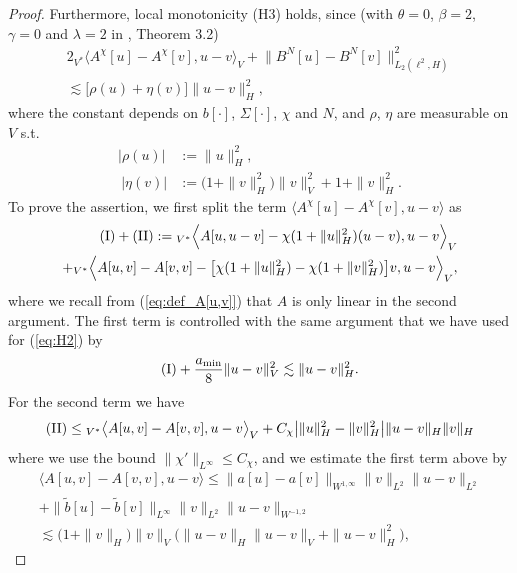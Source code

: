 \begin{proof}
Furthermore, local monotonicity (H3) holds, since (with $\theta = 0$, $\beta = 2$, $\gamma = 0$ and $\lambda = 2$ in \cite{RSZ22}, Theorem 3.2)
    \begin{equation}\label{eq:H3}
    \begin{split}
2{}_{V^*}\big\langle A^{\chi}[u] - A^{\chi}[v], u-v\big\rangle_V + \big\|B^N[u] - B^N[v]\big\|_{L_2(\ell^2,H)}^2 \\ \lesssim \big[\rho(u) + \eta(v)\big] \|u-v\|_H^2,
\end{split}
    \end{equation}
where the constant depends on $b[\cdot]$, $\Sigma[\cdot]$, $\chi$ and $N$, and $\rho$, $\eta$ are measurable on $V$ s.t.
\begin{align*}
    |\rho(u)|  & := \|u\|_{H}^2,\\
    \ |\eta(v)| & :=\big(1 + \|v\|^2_{H}\big)\|v\|^2_V + 1 + \|v\|^2_{H}.
\end{align*}
To prove the assertion, we first split the term $\big\langle A^{\chi}[u] - A^{\chi}[v] , u -v  \big\rangle$ as
\begin{align*}
 (\rom{1}) + (\rom{2})  : =  {}_{V^*}\Big\langle A[u,u - v] - \chi(1 + \|u\|_{H}^2) (u-v), u -v  \Big\rangle_V\\
     +  {}_{V^*}\Big\langle A[u,v] - A[v,v] - \big[\chi(1 + \|u\|_{H}^2) - \chi(1 + \|v\|_{H}^2)\big]v, u -v  \Big\rangle_V,
    \end{align*}
where we recall from (\ref{eq:def_A[u,v]}) that $A$ is only linear in the second argument. The first term is controlled with the same argument that we have used for (\ref{eq:H2}) by 
\begin{equation}\label{eq:loc_mon_I}
     (\rom{1}) + \frac{a_{\min}}{8} \|u - v\|_{V}^2  \lesssim \|u-v\|_H^2.
\end{equation}
For the second term we have 
\begin{align*}
     (\rom{2}) 
 \leq {}_{V^*}\big\langle A[u,v] - A[v,v], u-v\big\rangle_V + C_{\chi}\big|\|u\|^2_{H}- \|v\|_{H}^2\big|\|u - v\|_H\|v\|_H 
\end{align*}
where we use the bound $\|\chi'\|_{L^{\infty}} \leq C_{\chi}$, and we estimate the first term above by
\begin{align*}
     \big\langle A[u,v] - A[v,v], u - v\big\rangle\leq  \big\|a[u] - a[v]\big\|_{W^{1,\infty}}\|v\|_{L^2}\|u-v\|_{L^2} \\
    + \big\|\tilde{b}[u] - \tilde{b}[v]\big\|_{L^{\infty}}\|v\|_{L^2}\|u-v\|_{W^{-1,2}}\\
    \lesssim  \big(1 + \|v\|_{H} \big)\|v\|_V \big( \|u - v\|_{H}\|u-v\|_V +  \|u - v\|_{H}^2\big),

\end{align*}
\end{proof}
